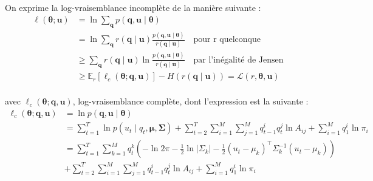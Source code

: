 \documentclass[12pt,a4paper,onecolumn]{article}
\begin{document}
\subsection{}

On exprime la log-vraisemblance incomplète de la manière suivante :
\begin{equation}
	\begin{split}
		\ell(\bm{\theta} ; \bm{u}) &= \ln \sum_{\bm{q}}p\left(\bm{q}, \bm{u} \mid \bm{\theta}\right)\\
		&= \ln \sum_{\bm{q}}r(\bm{q} \mid \bm{u}) \frac{p\left(\bm{q}, \bm{u} \mid \bm{\theta}\right)}{r(\bm{q} \mid \bm{u})} \quad \text{pour r quelconque}\\
		&\ge \sum_{\bm{q}}r(\bm{q} \mid \bm{u}) \ln \frac{p\left(\bm{q}, \bm{u} \mid \bm{\theta}\right)}{r(\bm{q} \mid \bm{u})} \quad \text{par l'inégalité de Jensen}\\
		&\ge \mathbb{E}_{r}[\ell_c(\bm{\theta} ; \bm{q}, \bm{u})]- H(r(\bm{q} \mid \bm{u})) = \mathcal{L}(r, \bm{\theta}, \bm{u})\\
	\end{split}
\end{equation}


avec \(\ell_c(\bm{\theta} ; \bm{q}, \bm{u})\), log-vraisemblance complète, dont l'expression est la suivante :
\begin{equation}
	\begin{split}
		\ell_c(\bm{\theta} ; \bm{q}, \bm{u}) &= \ln p\left(\bm{q}, \bm{u} \mid \bm{\theta}\right) \\
		&= \sum_{t=1}^{T}\ln p(u_t \mid q_t, \bm{\mu}, \bm{\Sigma}) + \sum_{t=2}^T \sum_{i = 1}^{M} \sum_{j = 1}^{M} q_{t-1}^i q_t^j \ln A_{ij} + \sum_{i = 1}^M q_1^i \ln \pi_i\\
		&= 	\sum_{t=1}^{T}\sum_{k=1}^M q_t^k \left(-\ln2\pi -\frac{1}{2}\ln|\Sigma_k| - \frac{1}{2}(u_t - \mu_k)^{\intercal}\Sigma_k^{-1}(u_t - \mu_k)\right)\\
		&+ \sum_{t=2}^T \sum_{i = 1}^{M} \sum_{j = 1}^{M} q_{t-1}^i q_t^j \ln A_{ij} + \sum_{i = 1}^M q_1^i \ln \pi_i\\
	\end{split}
	\label{eq_llh_c}
\end{equation}
\end{document}
